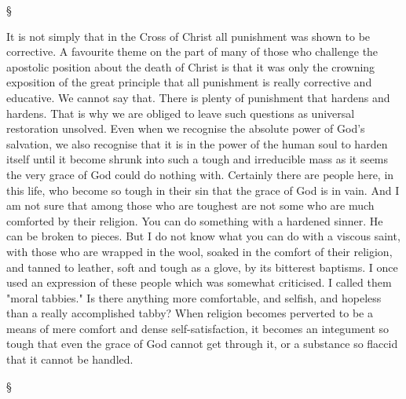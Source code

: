 \documentclass[12pt,letterpaper,oneside]{book}
\begin{document}
\begin{center}
\S
\end{center}

It is not simply that in the Cross of Christ 
all punishment was shown to be corrective. A 
favourite theme on the part of many of those 
who challenge the apostolic position about the 
death of Christ is that it was only the crowning 
exposition of the great principle that all punishment 
is really corrective and educative. We 
cannot say that. There is plenty of punishment 
that hardens and hardens. That is why we are 
obliged to leave such questions as universal 
restoration unsolved. Even when we recognise 
the absolute power of God's salvation, we also 
recognise that it is in the power of the human 
soul to harden itself until it become shrunk into 
such a tough and irreducible mass as it seems 
the very grace of God could do nothing with. 
Certainly there are people here, in this life, who 
become so tough in their sin that the grace of 
God is in vain. And I am not sure that among 
those who are toughest are not some who are 
much comforted by their religion. You can do 
something with a hardened sinner. He can be 
broken to pieces. But I do not know what 
you can do with a viscous saint, with those 
who are wrapped in the wool, soaked in the 
comfort of their religion, and tanned to leather, 
soft and tough as a glove, by its bitterest baptisms. 
I once used an expression of these people 
which was somewhat criticised. I called them 
"moral tabbies." Is there anything more comfortable, 
and selfish, and hopeless than a really 
accomplished tabby? When religion becomes 
perverted to be a means of mere comfort and 
dense self-satisfaction, it becomes an integument 
so tough that even the grace of God 
cannot get through it, or a substance so flaccid 
that it cannot be handled. 

\begin{center}
\S
\end{center}
\end{document}
